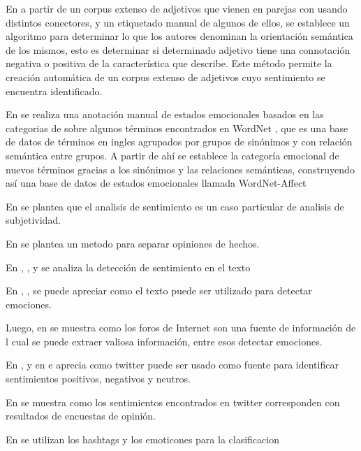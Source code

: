En \cite{hatzivassiloglou1997predicting} a partir de un corpus extenso de adjetivos que vienen en parejas con usando distintos conectores, y un etiquetado manual de algunos de ellos, se establece un algoritmo para determinar lo que los autores denominan la orientación semántica de los mismos, esto es determinar si determinado adjetivo tiene una connotación negativa o positiva de la característica que describe. Este método permite la creación automática de un corpus extenso de adjetivos cuyo sentimiento se encuentra identificado.

En \cite{strapparava2004wordnet} se realiza una anotación manual de estados emocionales basados en las categorias de \cite{ortony1987referential} sobre algunos términos encontrados en WordNet \cite{miller1995wordnet}, que es una base de datos de términos en ingles agrupados por grupos de sinónimos y con relación semántica entre grupos. A partir de ahí se establece la categoría emocional de nuevos términos gracias a los sinónimos y las relaciones semánticas, construyendo así una base de datos de estados emocionales llamada WordNet-Affect

En \cite{wiebe1994tracking} se plantea que el analisis de sentimiento es un caso particular de analisis de subjetividad.


En \cite{yu2003towards} se plantea un metodo para separar opiniones de hechos.





En \cite{pang2002thumbs}, \cite{turney2002thumbs},  y  se analiza la detección de sentimiento en el texto

En \cite{wiebe2005annotating}, \cite{alm2005emotions},\cite{aman2007identifying}  se puede apreciar como el texto puede ser utilizado para detectar emociones.

Luego, en \cite{pang2008opinion} se muestra como los foros de Internet son una fuente de información de l cual se puede extraer valiosa información, entre esos detectar emociones.


En \cite{pak2010twitter}, \cite{kouloumpis2011twitter} y en \cite{go2009twitter}e aprecia como twitter puede ser usado como fuente para identificar sentimientos positivos, negativos y neutros.

En \cite{o2010tweets} se muestra como los sentimientos encontrados en twitter corresponden con resultados de encuestas de opinión.

En \cite{davidov2010enhanced} se utilizan los hashtags y los emoticones para la clasificacion


